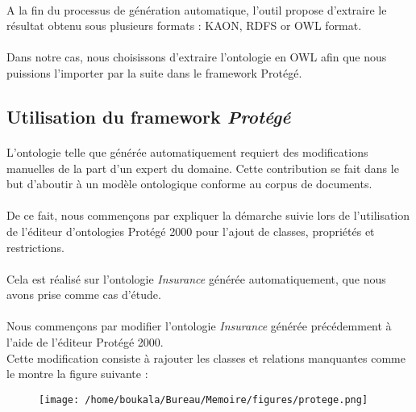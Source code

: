 \documentclass[12pt, a4paper, oneside]{book}
\begin{document}
\paragraph{}
A la fin du processus de génération automatique, l'outil propose d'extraire le résultat obtenu sous plusieurs formats : KAON, RDFS or OWL format.
\paragraph{}
Dans notre cas, nous choisissons d'extraire l'ontologie en OWL afin que nous puissions l'importer par la suite dans le framework Protégé.


\subsection{Utilisation du framework \emph{Protégé}}
\paragraph{}
L'ontologie telle que générée automatiquement requiert des modifications manuelles de la part d'un expert du domaine. Cette contribution se fait dans le but d'aboutir à un modèle ontologique conforme au corpus de documents. 
\paragraph{}
De ce fait, nous commençons par expliquer la démarche suivie lors de l'utilisation de l'éditeur d'ontologies Protégé 2000 pour l'ajout de classes, propriétés et restrictions. 
\paragraph{}
Cela est réalisé sur l'ontologie \emph{Insurance} générée automatiquement, que nous avons prise comme cas
d'étude.
\paragraph{}
Nous commençons par modifier l'ontologie \emph{Insurance} générée précédemment à l'aide de l'éditeur Protégé 2000.\\ Cette modification consiste à rajouter les classes et relations manquantes comme le montre la figure suivante :


\begin{figure}[h!]
\begin{center}
\texttt{[image: /home/boukala/Bureau/Memoire/figures/protege.png]}
\end{center}
\end{figure}
\end{document}
